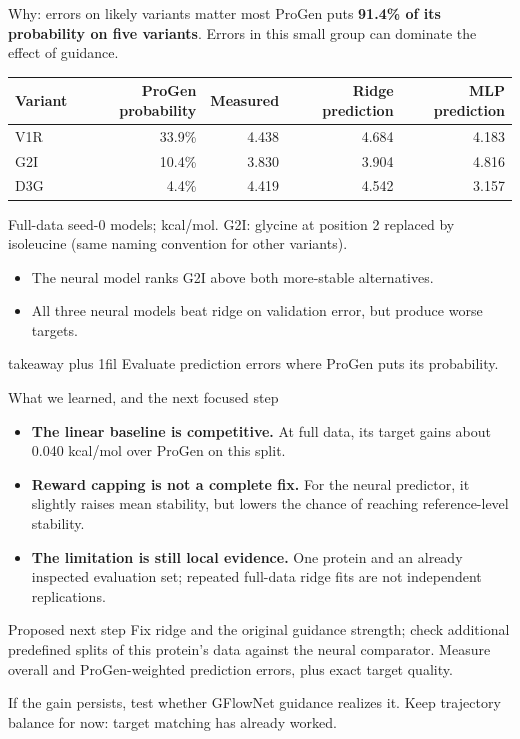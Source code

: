 \documentclass[10pt,aspectratio=169]{beamer}
\renewcommand{\arraystretch}{1.17}
\newcommand{\takeaway}[1]{%
  \par\vspace{2mm}\vfill
  \begin{beamercolorbox}[wd=\textwidth,sep=2mm]{takeaway}
    \small\RaggedRight\leftskip=2mm\rightskip=2mm plus 1fil #1
  \end{beamercolorbox}
}
\begin{document}
\begin{frame}[t]{Why: errors on likely variants matter most}
\RaggedRight
ProGen puts \textbf{91.4\% of its probability on five variants}.
Errors in this small group can dominate the effect of guidance.

\begin{center}
\renewcommand{\arraystretch}{1.25}
\begin{tabular}{lrrrr}
\toprule
Variant & ProGen probability & Measured & Ridge prediction & MLP prediction\\
\midrule
V1R & 33.9\% & 4.438 & 4.684 & 4.183\\
G2I & 10.4\% & 3.830 & 3.904 & 4.816\\
D3G & 4.4\% & 4.419 & 4.542 & 3.157\\
\bottomrule
\end{tabular}
\end{center}
Full-data seed-0 models; kcal/mol. G2I: glycine at position 2 replaced by
isoleucine (same naming convention for other variants).

\begin{itemize}
\item The neural model ranks G2I above both more-stable alternatives.
\item All three neural models beat ridge on validation error, but produce worse targets.
\end{itemize}
\takeaway{Evaluate prediction errors where ProGen puts its probability.}
\end{frame}

\begin{frame}[t]{What we learned, and the next focused step}
\RaggedRight
\begin{itemize}
\setlength{\itemsep}{4pt}
\item \textbf{The linear baseline is competitive.} At full data, its target gains
about 0.040 kcal/mol over ProGen on this split.
\item \textbf{Reward capping is not a complete fix.} For the neural predictor,
it slightly raises mean stability, but lowers the chance of reaching reference-level stability.
\item \textbf{The limitation is still local evidence.} One protein and an already
inspected evaluation set; repeated full-data ridge fits are not independent replications.
\end{itemize}
\vspace{2mm}
\begin{block}{Proposed next step}
Fix ridge and the original guidance strength; check additional predefined
splits of this protein's data against the neural comparator. Measure overall
and ProGen-weighted prediction errors, plus exact target quality.

If the gain persists, test whether GFlowNet guidance realizes it. Keep trajectory
balance for now: target matching has already worked.
\end{block}
\end{frame}
\end{document}
